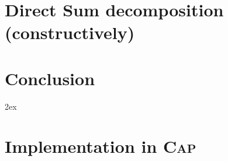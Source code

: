 \documentclass{article}
\begin{document}
\section{Direct Sum decomposition (constructively)}



\section{Conclusion}


\begingroup
     \parindent 0pt
     \parskip 2ex
     \def\enotesize{\normalsize}
     \theendnotes
\endgroup 



\appendix
\renewcommand{\thesection}{\Alph{section}}
\section{Implementation in \textsc{Cap}}

\end{document}
